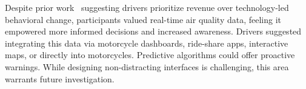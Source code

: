 Despite prior work~\cite{tieanklin2024rideshare} suggesting drivers prioritize revenue over technology-led behavioral change, participants valued real-time air quality data, feeling it empowered more informed decisions and increased awareness.
Drivers suggested integrating this data via motorcycle dashboards, ride-share apps, interactive maps, or directly into motorcycles.
Predictive algorithms could offer proactive warnings.
While designing non-distracting interfaces is challenging, this area warrants future investigation.


